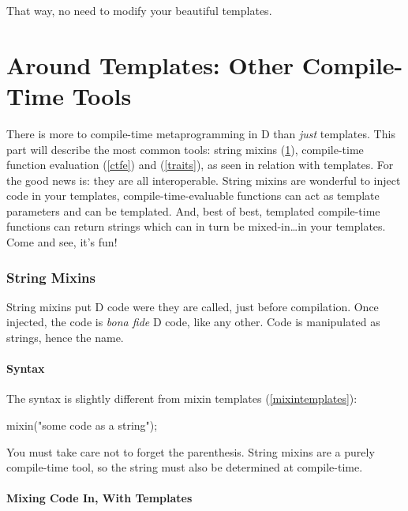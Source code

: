 That way, no need to modify your beautiful templates.



\newpage %
\part{Around Templates: Other Compile-Time Tools}\label{around}

There is more to compile-time metaprogramming in D than \emph{just} templates. This part will describe the most common tools: string mixins (\ref{stringmixins}), compile-time function evaluation (\ref{ctfe}) and  (\ref{traits}), as seen in relation with templates. For the good news is: they are all interoperable. String mixins are wonderful to inject code in your templates, compile-time-evaluable functions can act as template parameters and can be templated. And, best of best, templated compile-time functions can return strings which can in turn be mixed-in\ldots in your templates. Come and see, it's fun!

\section{String Mixins} \label{stringmixins}

String mixins put D code were they are called, just before compilation. Once injected, the code is \emph{bona fide} D code, like any other. Code is manipulated as strings, hence the name.

\subsection{Syntax}\label{stringmixinssyntax}

The syntax is slightly different from mixin templates (\ref{mixintemplates}):

\begin{dcode}
mixin("some code as a string");
\end{dcode}

You must take care not to forget the parenthesis. String mixins are a purely compile-time tool, so the string must also be determined at compile-time.

\subsection{Mixing Code In, With Templates}\label{stringmixinsandtemplates}

